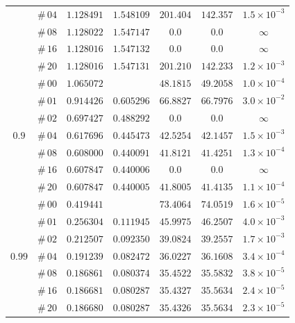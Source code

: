 \documentclass[12pt]{extarticle}
\theoremstyle{plain}
\theoremstyle{remark}
\begin{document}
\begin{table}[!ht]
\begin{center}
\begin{tabular}{ccccccc}
 & $\#\,04$ & $1.128491$ & $1.548109$ & $201.404$ & $142.357$ & $1.5\times10^{-3}$ \\
 & $\#\,08$ & $1.128022$ & $1.547147$ & $0.0$ & $0.0$ & $\infty$ \\
 & $\#\,16$ & $1.128016$ & $1.547132$ & $0.0$ & $0.0$ & $\infty$ \\
 & $\#\,20$ & $1.128016$ & $1.547131$ & $201.210$ & $142.233$ & $1.2\times10^{-3}$ \\
\midrule
\multirow{7}{*}{$0.9$} & $\#\,00$ & $1.065072$ &  & $48.1815$ & $49.2058$ & $1.0\times10^{-4}$ \\
 & $\#\,01$ & $0.914426$ & $0.605296$ & $66.8827$ & $66.7976$ & $3.0\times10^{-2}$ \\
 & $\#\,02$ & $0.697427$ & $0.488292$ & $0.0$ & $0.0$ & $\infty$ \\
 & $\#\,04$ & $0.617696$ & $0.445473$ & $42.5254$ & $42.1457$ & $1.5\times10^{-3}$ \\
 & $\#\,08$ & $0.608000$ & $0.440091$ & $41.8121$ & $41.4251$ & $1.3\times10^{-4}$ \\
 & $\#\,16$ & $0.607847$ & $0.440006$ & $0.0$ & $0.0$ & $\infty$ \\
 & $\#\,20$ & $0.607847$ & $0.440005$ & $41.8005$ & $41.4135$ & $1.1\times10^{-4}$ \\
\midrule
\multirow{7}{*}{$0.99$} & $\#\,00$ & $0.419441$ &  & $73.4064$ & $74.0519$ & $1.6\times10^{-5}$ \\
 & $\#\,01$ & $0.256304$ & $0.111945$ & $45.9975$ & $46.2507$ & $4.0\times10^{-3}$ \\
 & $\#\,02$ & $0.212507$ & $0.092350$ & $39.0824$ & $39.2557$ & $1.7\times10^{-3}$ \\
 & $\#\,04$ & $0.191239$ & $0.082472$ & $36.0227$ & $36.1608$ & $3.4\times10^{-4}$ \\
 & $\#\,08$ & $0.186861$ & $0.080374$ & $35.4522$ & $35.5832$ & $3.8\times10^{-5}$ \\
 & $\#\,16$ & $0.186681$ & $0.080287$ & $35.4327$ & $35.5634$ & $2.4\times10^{-5}$ \\
 & $\#\,20$ & $0.186680$ & $0.080287$ & $35.4326$ & $35.5634$ & $2.3\times10^{-5}$ \\
\bottomrule
\end{tabular}
\label{supp-table-3D-IterativeMethod-M=0.50}
\end{center}
\end{table}
\end{document}
